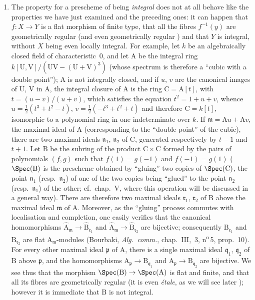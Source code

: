 \begin{remarks}[6.5.5]
\begin{enumerate}[label=(\roman*)]
  \item The property for a prescheme of being \emph{integral} does not at all behave like the properties we have just examined and the preceding ones: it can happen that $f:X\to Y$ is a flat morphism of finite type, that all the fibres $f^{-1}(y)$ are geometrically regular (and even geometrically regular ) and that $Y$ is integral, without $X$ being even locally integral.
For example, let $k$ be an algebraically closed field of characteristic~$0$, and let $\mathrm{A}$ be the integral ring $k[\mathrm{U},\mathrm{V}]/(\mathrm{U}\mathrm{V}-(\mathrm{U}+\mathrm{V})^3)$ (whose spectrum is therefore a ``cubic with a double point''); $\mathrm{A}$ is not integrally closed, and if $u$, $v$ are the canonical images of $\mathrm{U}$, $\mathrm{V}$ in $\mathrm{A}$, the integral closure of $\mathrm{A}$ is the ring $\mathrm{C}=\mathrm{A}[t]$, with $t=(u-v)/(u+v)$, which satisfies the equation $t^2=1+u+v$, whence $u=\frac{1}{2}(t^3+t^2-t)$, $v=\frac{1}{2}(-t^3+t^2+t)$ and therefore $\mathrm{C}=k[t]$, isomorphic to a polynomial ring in one indeterminate over $k$.
If $\mathfrak{m}=\mathrm{A} u+\mathrm{A} v$, the maximal ideal of $\mathrm{A}$ (corresponding to the ``double point'' of the cubic), there are two maximal ideals $\mathfrak{n}_1$, $\mathfrak{n}_2$ of $\mathrm{C}$, generated respectively by $t-1$ and $t+1$.
Let $\mathrm{B}$ be the subring of the product $\mathrm{C}\times\mathrm{C}$ formed by the pairs of polynomials $(f,g)$ such that $f(1)=g(-1)$ and $f(-1)=g(1)$ ($\Spec(\mathrm{B})$ is the prescheme obtained by ``gluing'' two copies of $\Spec(\mathrm{C})$, the point $\mathfrak{n}_1$ (resp.\ $\mathfrak{n}_2$) of one of the two copies being ``glued'' to the point $\mathfrak{n}_2$ (resp.\ $\mathfrak{n}_1$) of the other; cf.\ chap.~V, where this operation will be discussed in a general way).
There are therefore two maximal ideals $\mathfrak{r}_1$, $\mathfrak{r}_2$ of $\mathrm{B}$ above the maximal ideal $\mathfrak{m}$ of $\mathrm{A}$.
Moreover, as the ``gluing'' process commutes with localisation and completion, one easily verifies that the canonical homomorphisms $\hat{\mathrm{A}}_\mathfrak{m}\to\hat{\mathrm{B}}_{\mathfrak{r}_1}$ and $\hat{\mathrm{A}}_\mathfrak{m}\to\hat{\mathrm{B}}_{\mathfrak{r}_2}$ are bijective; consequently $\mathrm{B}_{\mathfrak{r}_1}$ and $\mathrm{B}_{\mathfrak{r}_2}$ are flat $\mathrm{A}_\mathfrak{m}$-modules (Bourbaki, \emph{Alg.\ comm.}, chap.~III, \textsection\,3, n\textsuperscript{o}\,5, prop.~10).
For every other maximal ideal $\mathfrak{p}$ of $\mathrm{A}$, there is a single maximal ideal $\mathfrak{q}_1$, $\mathfrak{q}_2$ of $\mathrm{B}$ above $\mathfrak{p}$, and the homomorphisms $\mathrm{A}_\mathfrak{p}\to\mathrm{B}_{\mathfrak{q}_1}$ and $\mathrm{A}_\mathfrak{p}\to\mathrm{B}_{\mathfrak{q}_2}$ are bijective.
We see thus that the morphism $\Spec(\mathrm{B})\to\Spec(\mathrm{A})$ is flat and finite, and that all its fibres are geometrically regular (it is even \emph{\'etale}, as we will see later ); however it is immediate that $\mathrm{B}$ is not integral.
\end{enumerate}
\end{remarks}

